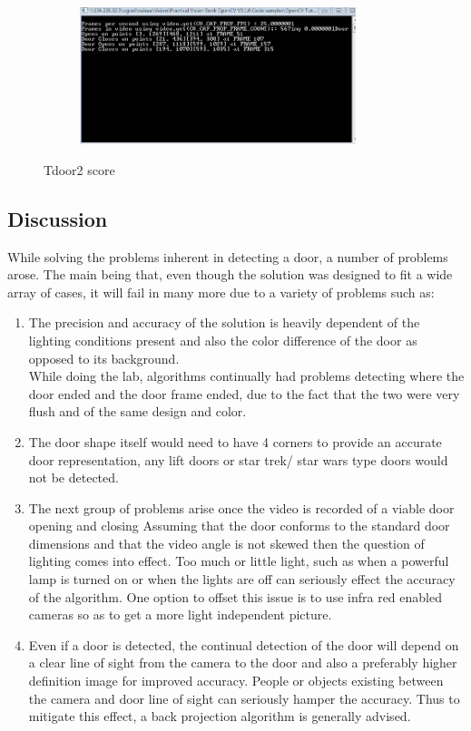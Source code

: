 \documentclass{article}
\begin{document}
\begin{figure}[H]
	\center
	\begin{subfigure}{0.5\textwidth}
		\includegraphics[width=0.9\linewidth, height=4cm]{door4_score.PNG} 
		\caption{}
		\label{fig:subim2}
	\end{subfigure}
	\caption{Tdoor2 score}
	\label{fig:image2}
\end{figure}

\subsection{Discussion}\label{sec:intro}
While solving the problems inherent in detecting a door, a number of problems arose. The main being that, even though the solution was designed to fit a wide array of cases, it will fail in many more due to a variety of problems such as:

\begin{enumerate}
	\item The precision and accuracy of the solution is heavily dependent of the lighting conditions present and also the color difference of the door as opposed to its background.\\ While doing the lab, algorithms continually had problems detecting where the door ended and the door frame ended, due to the fact that the two were very flush and of the same design and color.
	\item The door shape itself would need to have 4 corners to provide an accurate door representation, any lift doors or star trek/ star wars type doors would not be detected. 
	
	\item The next group of problems arise once the video is recorded of a viable door opening and closing Assuming that the door conforms to the standard door dimensions and that the video angle is not skewed then the question of lighting comes into effect. Too much or little light, such as when a powerful lamp is turned on or when the lights are off can seriously effect the accuracy of the algorithm. One option to offset this issue is to use infra red enabled cameras so as to get a more light independent picture.
	
	\item Even if a door is detected, the continual detection of the door will depend on a clear line of sight from the camera to the door and also a preferably higher definition image for improved accuracy. People or objects existing between the camera and door line of sight can seriously hamper the accuracy. Thus to mitigate this effect, a back projection algorithm is generally advised.
	
	
\end{enumerate}
\end{document}
